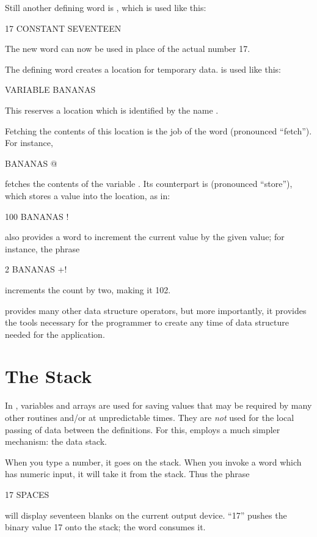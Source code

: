 Still another defining word is , which
is used like this:
\begin{Code}
17 CONSTANT SEVENTEEN
\end{Code}
The new word  can now be used in place of the actual
number 17.

{\sloppy
The defining word  creates a location
for temporary data.  is used like this:
\begin{Code}
VARIABLE BANANAS
\end{Code}
This reserves a location which is identified by the name .}

Fetching the contents of this location is the job of the word 
(pronounced ``fetch'').  For instance,
\begin{Code}
BANANAS @
\end{Code}
fetches the contents of the variable .  Its counterpart is
\forthb{!} (pronounced ``store''), which stores a value into the location,
as in:
\begin{Code}
100 BANANAS !
\end{Code}
\Forth{} also provides a word to increment the current value by the given
value; for instance, the phrase
\begin{Code}
2 BANANAS +!
\end{Code}
increments the count by two, making it 102.

\Forth{} provides many other
data structure operators, but more
importantly, it provides the tools necessary for the programmer to
create any time of data structure needed for the application.%
%

\section{The Stack}
In \Forth{}, variables and arrays are used for saving values that may be
required by many other routines and/or at unpredictable times.  They are
\emph{not} used for the local passing of data between the definitions.
For this, \Forth{} employs a much simpler mechanism: the data stack.

When you type a number, it goes on the stack.  When you invoke a word
which has numeric input, it will take it from the stack.  Thus the phrase
\begin{Code}
17 SPACES
\end{Code}
will display seventeen blanks on the current output device.  ``17'' pushes
the binary value 17 onto the stack; the word  consumes it.

